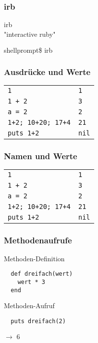 \documentclass{beamer}
\begin{document}
\begin{frame}[fragile]
  \frametitle{irb}
  \begin{center}
   {\LARGE irb}\\
   
   \bigskip
   "interactive ruby"
   \bigskip
   \bigskip
   \bigskip
   \bigskip
   
  \end{center}
   shellprompt\$ irb

\end{frame}

\begin{frame}[fragile]
  \frametitle{Ausdrücke und Werte}
  \begin{tabular}[t]{l@{\hspace{5em}$\longrightarrow$}l}
    \lstinline|1|       &   \lstinline|1|  \\
    \lstinline|1 + 2|   &   \lstinline|3|  \\
    \lstinline|a = 2|   &   \lstinline|2|  \\
    \lstinline|1+2; 10+20; 17+4|  &   \lstinline|21|  \\
    \lstinline|puts 1+2|   &   \lstinline|nil|  \\
  \end{tabular}
  
\end{frame}

\begin{frame}[fragile]
  \frametitle{Namen und Werte}
  \begin{tabular}[t]{l@{\hspace{5em}$\longrightarrow$}l}
    \lstinline|1|       &   \lstinline|1|  \\
    \lstinline|1 + 2|   &   \lstinline|3|  \\
    \lstinline|a = 2|   &   \lstinline|2|  \\
    \lstinline|1+2; 10+20; 17+4|  &   \lstinline|21|  \\
    \lstinline|puts 1+2|   &   \lstinline|nil|  \\
  \end{tabular}
  
\end{frame}

\begin{frame}[fragile]
  \frametitle{Methodenaufrufe}
  Methoden-Definition
  \begin{lstlisting}
  def dreifach(wert)
    wert * 3
  end
  \end{lstlisting}
  \pause
  Methoden-Aufruf
  \begin{lstlisting}
  puts dreifach(2) 
  \end{lstlisting}
  $\longrightarrow$ 6
\end{frame}
\end{document}
